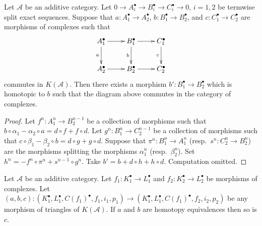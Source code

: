 \begin{lemma}
\label{lemma-make-commute}
Let $\mathcal{A}$ be an additive category.
Let $0 \to A_i^\bullet \to B_i^\bullet \to C_i^\bullet \to 0$, $i = 1, 2$
be termwise split exact sequences. Suppose that
$a : A_1^\bullet \to A_2^\bullet$,
$b : B_1^\bullet \to B_2^\bullet$, and
$c : C_1^\bullet \to C_2^\bullet$ are morphisms of complexes
such that
$$
\xymatrix{
A_1^\bullet \ar[d]_a \ar[r] &
B_1^\bullet \ar[r] \ar[d]_b &
C_1^\bullet \ar[d]_c \\
A_2^\bullet \ar[r] & B_2^\bullet \ar[r] & C_2^\bullet
}
$$
commutes in $K(\mathcal{A})$. Then there exists a morphism
$b' : B_1^\bullet \to B_2^\bullet$
which is homotopic to $b$ such that the diagram above commutes
in the category of complexes.
\end{lemma}

\begin{proof}
Let $f^n : A_1^n \to B_2^{n - 1}$ be a collection of morphisms
such that $b \circ \alpha_1 - \alpha_2 \circ a =
d  \circ f + f \circ d$. Let
$g^n : B_1^n \to C_2^{n - 1}$ be a collection of morphisms
such that $c \circ \beta_1 - \beta_2 \circ b =
d  \circ g + g \circ d$. Suppose that
$\pi^n : B_1^n \to A_1^n$ (resp.\ $s^n : C_2^n \to B_2^n$)
are the morphisms splitting the morphisms $\alpha_1^n$
(resp.\ $\beta_2^n$). Set $h^n = - f^n \circ \pi^n + s^{n - 1} \circ g^n$.
Take $b' = b + d \circ h + h \circ d$. Computation omitted.
\end{proof}

\begin{lemma}
\label{lemma-third-isomorphism}
Let $\mathcal{A}$ be an additive category.
Let $f_1 : K_1^\bullet \to L_1^\bullet$ and
$f_2 : K_2^\bullet \to L_2^\bullet$ be morphisms of complexes.
Let $(a, b, c) : (K_1^\bullet, L_1^\bullet, C(f_1)^\bullet, f_1, i_1, p_1)
\to  (K_1^\bullet, L_1^\bullet, C(f_1)^\bullet, f_2, i_2, p_2)$
be any morphism of triangles of $K(\mathcal{A})$.
If $a$ and $b$ are homotopy equivalences then so is $c$.
\end{lemma}

